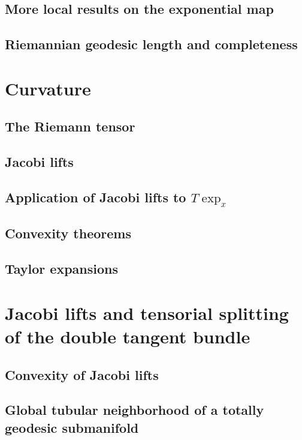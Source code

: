 \documentclass[a4paper]{article}
\begin{document}
\subsection{More local results on the exponential map}

\subsection{Riemannian geodesic length and completeness}

\section{Curvature}

\subsection{The Riemann tensor}

\subsection{Jacobi lifts}

\subsection{Application of Jacobi lifts to $T\exp_x$}

\subsection{Convexity theorems}

\subsection{Taylor expansions}

\section{Jacobi lifts and tensorial splitting of the double tangent bundle}

\subsection{Convexity of Jacobi lifts}

\subsection{Global tubular neighborhood of a totally geodesic submanifold}
\end{document}

